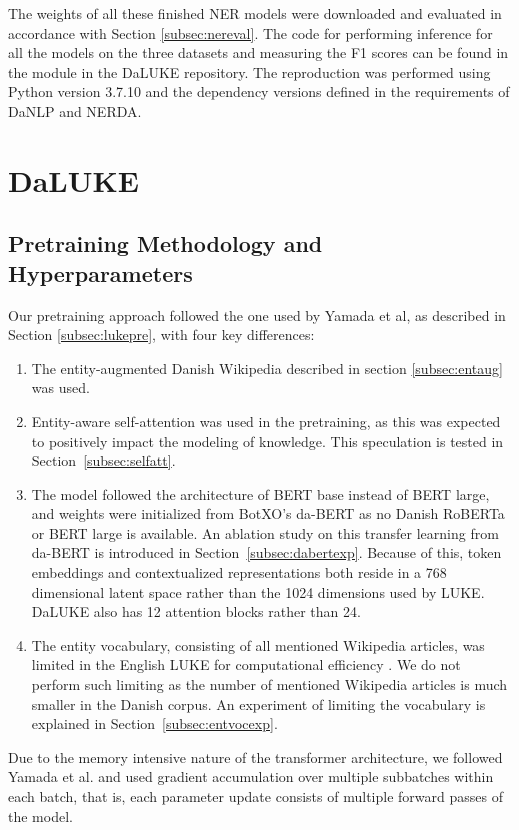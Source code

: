 \documentclass[main.tex]{subfiles}
\begin{document}
\noindent
The weights of all these finished NER models were downloaded and evaluated in accordance with Section \ref{subsec:nereval}.
The code for performing inference for all the models on the three datasets and measuring the F1 scores can be found in the module  in the DaLUKE repository\footnotemark.
The reproduction was performed using Python version 3.7.10 and the dependency versions defined in the requirements of DaNLP and NERDA.
\section{DaLUKE}

\subsection{Pretraining Methodology and Hyperparameters}%
\label{sub:dalpre}
Our pretraining approach followed the one used by Yamada et al, as described in Section \ref{subsec:lukepre}, with four key differences:
\begin{enumerate}
    \item The entity-augmented Danish Wikipedia described in section \ref{subsec:entaug} was used.
    \item
        Entity-aware self-attention was used in the pretraining, as this was expected to positively impact the modeling of knowledge.
        This speculation is tested in Section~\ref{subsec:selfatt}.
    \item 
        The model followed the architecture of BERT base instead of BERT large, and weights were initialized from BotXO's da-BERT \cite{botxo2019dabert} as no Danish RoBERTa or BERT large is available.
        An ablation study on this transfer learning from da-BERT is introduced in Section~\ref{subsec:dabertexp}.
        Because of this, token embeddings and contextualized representations both reside in a 768 dimensional latent space rather than the 1024 dimensions used by LUKE.
        DaLUKE also has 12 attention blocks rather than 24.
        \cite[Sec. 3.4]{yamada2020luke}
    \item
        The entity vocabulary, consisting of all mentioned Wikipedia articles, was limited in the English LUKE for computational efficiency \cite[Sec. 3.4]{yamada2020luke}.
        We do not perform such limiting as the number of mentioned Wikipedia articles is much smaller in the Danish corpus.
        An experiment of limiting the vocabulary is explained in Section~\ref{subsec:entvocexp}.
\end{enumerate}
Due to the memory intensive nature of the transformer architecture, we followed Yamada et al. and used gradient accumulation over multiple subbatches within each batch, that is, each parameter update consists of multiple forward passes of the model.
\end{document}
